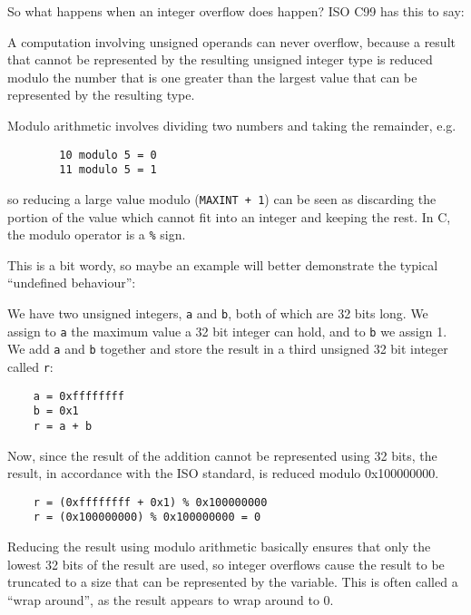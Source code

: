 \documentclass{iacrtrans}
\begin{document}
So what happens when an integer overflow does happen?  ISO C99 has this to
say:

\begin{displayquote}
    A computation involving unsigned operands can never overflow,
    because a result that cannot be represented by the resulting unsigned
    integer type is reduced modulo the number that is one greater than
    the largest value that can be represented by the resulting type.
\end{displayquote}

\begin{framed}
    Modulo arithmetic involves dividing two numbers and taking the
    remainder,
    e.g.
    \begin{verbatim}
        10 modulo 5 = 0
        11 modulo 5 = 1
    \end{verbatim}
    so reducing a large value modulo (\texttt{MAXINT + 1}) can be seen as discarding the
    portion of the value which cannot fit into an integer and keeping the rest.
    In C, the modulo operator is a \texttt{\%} sign.
\end{framed}

This is a bit wordy, so maybe an example will better demonstrate the
typical ``undefined behaviour'':

We have two unsigned integers, \texttt{a} and \texttt{b}, both of which are 32 bits long.  We
assign to \texttt{a} the maximum value a 32 bit integer can hold, and to \texttt{b} we assign
1.  We add \texttt{a} and \texttt{b} together and store the result in a third unsigned 32 bit
integer called \texttt{r}:

\begin{verbatim}
    a = 0xffffffff
    b = 0x1
    r = a + b
\end{verbatim}

Now, since the result of the addition cannot be represented using 32 bits,
the result, in accordance with the ISO standard, is reduced modulo
0x100000000.

\begin{verbatim}
    r = (0xffffffff + 0x1) % 0x100000000
    r = (0x100000000) % 0x100000000 = 0
\end{verbatim}

Reducing the result using modulo arithmetic basically ensures that only the
lowest 32 bits of the result are used, so integer overflows cause the
result to be truncated to a size that can be represented by the variable.
This is often called a ``wrap around'', as the result appears to wrap around
to 0.
\end{document}
